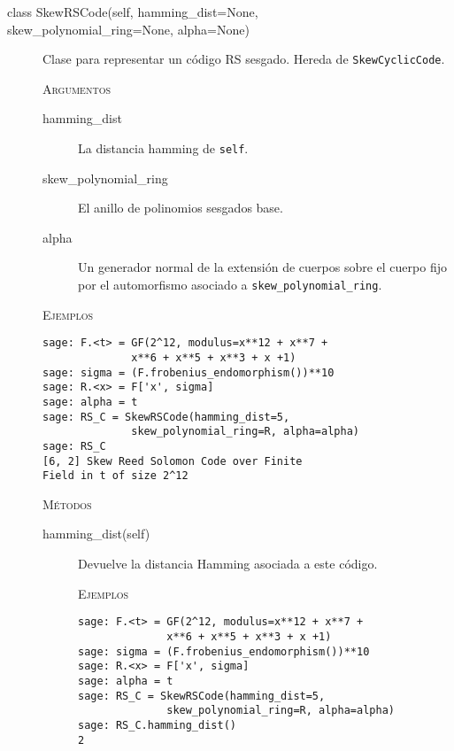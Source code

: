 \begin{description}
    \item[class SkewRSCode(self, hamming\_dist=None, \\skew\_polynomial\_ring=None, alpha=None)]

    Clase para representar un código RS sesgado. Hereda de \texttt{SkewCyclicCode}.

    \textsc{Argumentos}
    \begin{description}
        \item[hamming\_dist] La distancia hamming de \texttt{self}.
        \item[skew\_polynomial\_ring] El anillo de polinomios sesgados base.
        \item[alpha] Un generador normal de la extensión de cuerpos sobre el cuerpo fijo por el automorfismo asociado a \texttt{skew\_polynomial\_ring}.
    \end{description}

    \textsc{Ejemplos}
    \begin{lstlisting}
sage: F.<t> = GF(2^12, modulus=x**12 + x**7 +
              x**6 + x**5 + x**3 + x +1)
sage: sigma = (F.frobenius_endomorphism())**10
sage: R.<x> = F['x', sigma]
sage: alpha = t
sage: RS_C = SkewRSCode(hamming_dist=5,
              skew_polynomial_ring=R, alpha=alpha)
sage: RS_C
[6, 2] Skew Reed Solomon Code over Finite
Field in t of size 2^12
    \end{lstlisting}

    \textsc{Métodos}
    \begin{description}
        \item[hamming\_dist(self)]
            Devuelve la distancia Hamming asociada a este código.

        \textsc{Ejemplos}
        \begin{lstlisting}
sage: F.<t> = GF(2^12, modulus=x**12 + x**7 +
              x**6 + x**5 + x**3 + x +1)
sage: sigma = (F.frobenius_endomorphism())**10
sage: R.<x> = F['x', sigma]
sage: alpha = t
sage: RS_C = SkewRSCode(hamming_dist=5,
              skew_polynomial_ring=R, alpha=alpha)
sage: RS_C.hamming_dist()
2
        \end{lstlisting}
    \end{description}
\end{description}

